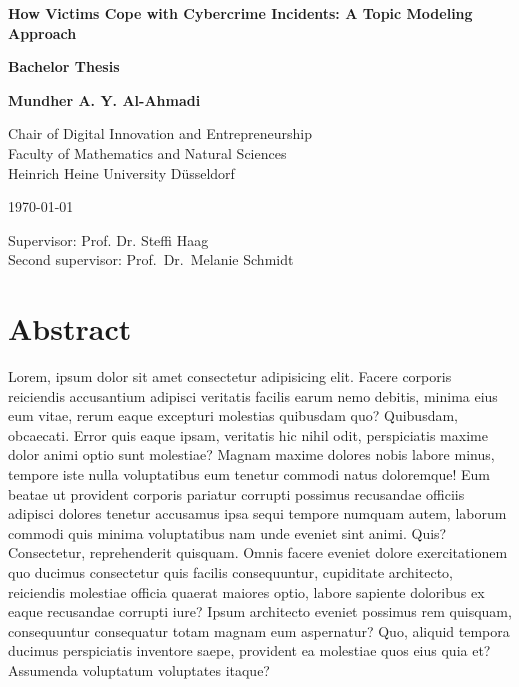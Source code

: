\documentclass[12pt,english,titlepage,a4paper]{article}
\begin{document}
\begin{titlepage}
\begin{center}

\textbf{\LARGE How Victims Cope with Cybercrime Incidents: A Topic Modeling Approach}

\bigskip\bigskip
\textbf{Bachelor Thesis}

\bigskip
\textbf{Mundher A. Y. Al-Ahmadi}



\vfill
Chair of Digital Innovation and Entrepreneurship\\ 
Faculty of Mathematics and Natural Sciences \\ 
Heinrich Heine University D\"usseldorf

\bigskip
\today

\bigskip
Supervisor: Prof. Dr. Steffi Haag \\
Second supervisor: Prof.\ Dr.\ Melanie Schmidt

\end{center}
\end{titlepage}

\thispagestyle{empty}\mbox{}\pagebreak
\setcounter{page}{0}

\section*{Abstract}
Lorem, ipsum dolor sit amet consectetur adipisicing elit. Facere corporis reiciendis accusantium adipisci veritatis facilis earum nemo debitis, minima eius eum vitae, rerum eaque excepturi molestias quibusdam quo? Quibusdam, obcaecati.
Error quis eaque ipsam, veritatis hic nihil odit, perspiciatis maxime dolor animi optio sunt molestiae? Magnam maxime dolores nobis labore minus, tempore iste nulla voluptatibus eum tenetur commodi natus doloremque!
Eum beatae ut provident corporis pariatur corrupti possimus recusandae officiis adipisci dolores tenetur accusamus ipsa sequi tempore numquam autem, laborum commodi quis minima voluptatibus nam unde eveniet sint animi. Quis?
Consectetur, reprehenderit quisquam. Omnis facere eveniet dolore exercitationem quo ducimus consectetur quis facilis consequuntur, cupiditate architecto, reiciendis molestiae officia quaerat maiores optio, labore sapiente doloribus ex eaque recusandae corrupti iure?
Ipsum architecto eveniet possimus rem quisquam, consequuntur consequatur totam magnam eum aspernatur? Quo, aliquid tempora ducimus perspiciatis inventore saepe, provident ea molestiae quos eius quia et? Assumenda voluptatum voluptates itaque?
\pagebreak
\end{document}
